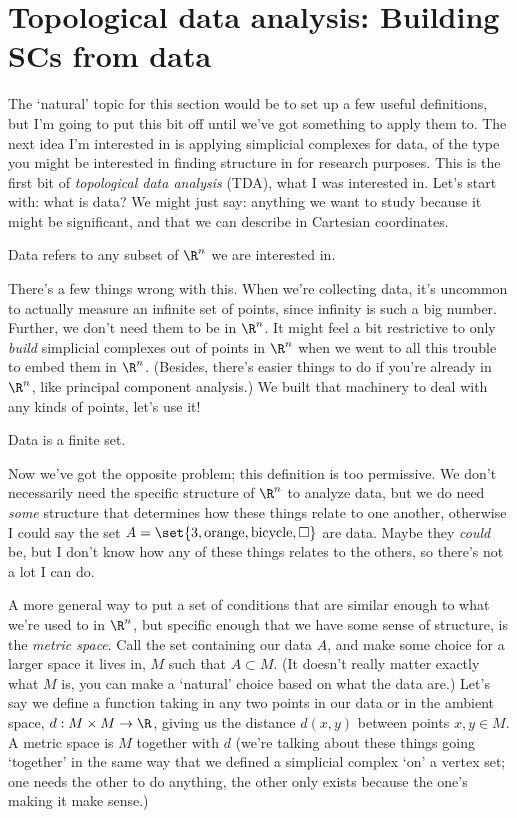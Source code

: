 \documentclass{lec}
\begin{document}
    \section{Topological data analysis: Building SCs from data}

    The `natural' topic for this section would be to set up a few useful definitions, but I'm going to put this bit off until we've got something to apply them to. The next idea I'm interested in is applying simplicial complexes for data, of the type you might be interested in finding structure in for research purposes. This is the first bit of \textit{topological data analysis} (TDA), what I was interested in. Let's start with: what is data? We might just say: anything we want to study because it might be significant, and that we can describe in Cartesian coordinates.

    \begin{wipdefinition}
        Data refers to any subset of $\R^n$ we are interested in.
    \end{wipdefinition}

    There's a few things wrong with this. When we're collecting data, it's uncommon to actually measure an infinite set of points, since infinity is such a big number. Further, we don't need them to be in $\R^n$. It might feel a bit restrictive to only \textit{build} simplicial complexes out of points in $\R^n$ when we went to all this trouble to embed them in $\R^n$. (Besides, there's easier things to do if you're already in $\R^n$, like principal component analysis.) We built that machinery to deal with any kinds of points, let's use it!

    \begin{wipdefinition}
        Data is a finite set. 
    \end{wipdefinition}

    Now we've got the opposite problem; this definition is too permissive. We don't necessarily need the specific structure of $\R^n$ to analyze data, but we do need \textit{some} structure that determines how these things relate to one another, otherwise I could say the set $A = \set{3, \text{orange}, \text{bicycle}, \square}$ are data. Maybe they \textit{could} be, but I don't know how any of these things relates to the others, so there's not a lot I can do. 

    A more general way to put a set of conditions that are similar enough to what we're used to in $\R^n$, but specific enough that we have some sense of structure, is the \textit{metric space}. Call the set containing our data $A$, and make some choice for a larger space it lives in, $M$ such that $A \subset M$. (It doesn't really matter exactly what $M$ is, you can make a `natural' choice based on what the data are.) Let's say we define a function taking in any two points in our data or in the ambient space, $d: M \times M \to \R$, giving us the distance $d(x, y)$ between points $x, y \in M$. A metric space is $M$ together with $d$ (we're talking about these things going `together' in the same way that we defined a simplicial complex `on' a vertex set; one needs the other to do anything, the other only exists because the one's making it make sense.) 
\end{document}
